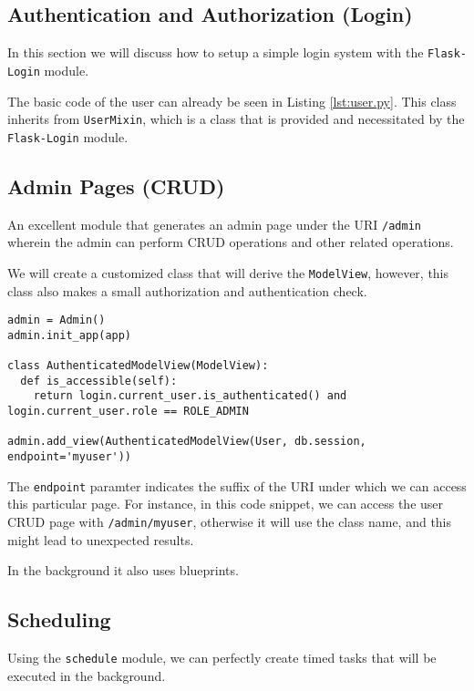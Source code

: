 \documentclass[../main/main.tex]{subfiles}
\begin{document}
\subsection{Authentication and Authorization (Login)}
\label{sec:auth}

In this section we will discuss how to setup a simple login system
with the \lstinline|Flask-Login| module. 

The basic code of the user can already be seen in Listing
\ref{lst:user.py}. This class inherits from \lstinline|UserMixin|,
which is a class that is provided and necessitated by the
\lstinline|Flask-Login| module. 

\subsection{Admin Pages (CRUD)}

An excellent module that generates an admin page under the URI
\lstinline|/admin| wherein the admin can perform CRUD operations and other
related operations. 

We will create a customized class that will derive the \lstinline|ModelView|,
however, this class also makes a small authorization and authentication check. 

\begin{lstlisting}
admin = Admin()
admin.init_app(app)

class AuthenticatedModelView(ModelView):
  def is_accessible(self):
    return login.current_user.is_authenticated() and login.current_user.role == ROLE_ADMIN

admin.add_view(AuthenticatedModelView(User, db.session, endpoint='myuser'))

\end{lstlisting}

The \lstinline|endpoint| paramter indicates the suffix of the URI under which we
can access this particular page. For instance, in this code snippet, we can
access the user CRUD page with \lstinline|/admin/myuser|, otherwise it will use
the class name, and this might lead to unexpected results. 

In the background it also uses blueprints. 

\subsection{Scheduling}

Using the \lstinline|schedule| module, we can perfectly create timed tasks that
will be executed in the background. 
\end{document}
